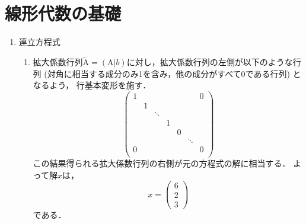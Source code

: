 \section{線形代数の基礎}

\begin{enumerate}[label=問\arabic*.]
  \vspace{2mm}
  \item 連立方程式

  \vspace{1mm}
  \begin{enumerate}[label=(\roman*)]
    \item
    拡大係数行列$\tilde{\mathrm{A}} = (\mathrm{A}|b)$に対し，拡大係数行列の左側が以下のような行列
    (対角に相当する成分のみ1を含み，他の成分がすべて0である行列) となるよう，
    行基本変形を施す．
    \begin{equation}
      \left(
        \begin{array}{rrrrrrr}
          1 &   &        &   &   &        & 0 \\
            & 1 &        &   &   &        &   \\
            &   & \ddots &   &   &        &   \\
            &   &        & 1 &   &        &   \\
            &   &        &   & 0 &        &   \\
            &   &        &   &   & \ddots &   \\
          0 &   &        &   &   &        & 0 \\
        \end{array}
      \right)
    \end{equation}
    この結果得られる拡大係数行列の右側が元の方程式の解に相当する．
    よって解$x$は，
    \begin{equation}
      x = \left(
        \begin{array}{r}
          6 \\ 2 \\ 3
        \end{array}
        \right)
    \end{equation}
    である．
    

\end{enumerate}
\end{enumerate}
